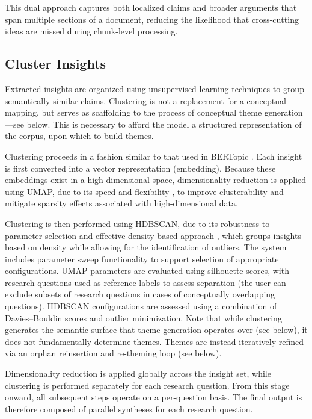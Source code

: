 \documentclass[
  11pt,
]{article}
\begin{document}
This dual approach captures both localized claims and broader arguments
that span multiple sections of a document, reducing the likelihood that
cross-cutting ideas are missed during chunk-level processing.

\subsection{Cluster Insights}\label{cluster-insights}

Extracted insights are organized using unsupervised learning techniques
to group semantically similar claims. Clustering is not a replacement
for a conceptual mapping, but serves as scaffolding to the process of
conceptual theme generation---see below. This is necessary to afford the
model a structured representation of the corpus, upon which to build
themes.

Clustering proceeds in a fashion similar to that used in BERTopic
\cite{grootendorst2022}. Each insight is first converted into a vector
representation (embedding). Because these embeddings exist in a
high-dimensional space, dimensionality reduction is applied using UMAP,
due to its speed and flexibility \cite{mcinnes2018}, to improve
clusterability and mitigate sparsity effects associated with
high-dimensional data.

Clustering is then performed using HDBSCAN, due to its robustness to
parameter selection and effective density-based approach \cite{mcinnes2017}, which groups insights based on density while allowing for the
identification of outliers. The system includes parameter sweep
functionality to support selection of appropriate configurations. UMAP
parameters are evaluated using silhouette scores, with research
questions used as reference labels to assess separation (the user can
exclude subsets of research questions in cases of conceptually
overlapping questions). HDBSCAN configurations are assessed using a
combination of Davies--Bouldin scores and outlier minimization. Note
that while clustering generates the semantic surface that theme
generation operates over (see below), it does not fundamentally
determine themes. Themes are instead iteratively refined via an orphan
reinsertion and re-theming loop (see below).

Dimensionality reduction is applied globally across the insight set,
while clustering is performed separately for each research question.
From this stage onward, all subsequent steps operate on a per-question
basis. The final output is therefore composed of parallel syntheses for
each research question.
\end{document}
